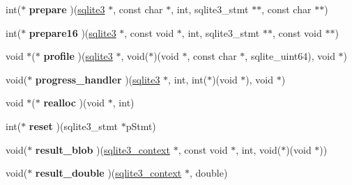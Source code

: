 \begin{DoxyCompactItemize}
\item 
\hypertarget{structsqlite3__api__routines_a6d5170ffef9564b7f9b157a14df4fd4d}{int($\ast$ {\bfseries prepare} )(\hyperlink{structsqlite3}{sqlite3} $\ast$, const char $\ast$, int, sqlite3\-\_\-stmt $\ast$$\ast$, const char $\ast$$\ast$)}\label{structsqlite3__api__routines_a6d5170ffef9564b7f9b157a14df4fd4d}

\item 
\hypertarget{structsqlite3__api__routines_a3877cfcfebeb05e357317ab50a47e52e}{int($\ast$ {\bfseries prepare16} )(\hyperlink{structsqlite3}{sqlite3} $\ast$, const void $\ast$, int, sqlite3\-\_\-stmt $\ast$$\ast$, const void $\ast$$\ast$)}\label{structsqlite3__api__routines_a3877cfcfebeb05e357317ab50a47e52e}

\item 
\hypertarget{structsqlite3__api__routines_aa3613866ee257c4b50e78bec33b7fb3a}{void $\ast$($\ast$ {\bfseries profile} )(\hyperlink{structsqlite3}{sqlite3} $\ast$, void($\ast$)(void $\ast$, const char $\ast$, sqlite\-\_\-uint64), void $\ast$)}\label{structsqlite3__api__routines_aa3613866ee257c4b50e78bec33b7fb3a}

\item 
\hypertarget{structsqlite3__api__routines_a2888055619addf1d754e25d159d85718}{void($\ast$ {\bfseries progress\-\_\-handler} )(\hyperlink{structsqlite3}{sqlite3} $\ast$, int, int($\ast$)(void $\ast$), void $\ast$)}\label{structsqlite3__api__routines_a2888055619addf1d754e25d159d85718}

\item 
\hypertarget{structsqlite3__api__routines_a8acf7aa698ed5e3a6ecc09ba9ced9fec}{void $\ast$($\ast$ {\bfseries realloc} )(void $\ast$, int)}\label{structsqlite3__api__routines_a8acf7aa698ed5e3a6ecc09ba9ced9fec}

\item 
\hypertarget{structsqlite3__api__routines_a0ac99b0282f1843dbd0170c22be99957}{int($\ast$ {\bfseries reset} )(sqlite3\-\_\-stmt $\ast$p\-Stmt)}\label{structsqlite3__api__routines_a0ac99b0282f1843dbd0170c22be99957}

\item 
\hypertarget{structsqlite3__api__routines_aab44964ab19917a95c1513890c5cdca2}{void($\ast$ {\bfseries result\-\_\-blob} )(\hyperlink{structsqlite3__context}{sqlite3\-\_\-context} $\ast$, const void $\ast$, int, void($\ast$)(void $\ast$))}\label{structsqlite3__api__routines_aab44964ab19917a95c1513890c5cdca2}

\item 
\hypertarget{structsqlite3__api__routines_a2a30d668aa648384ab1058cf77924c33}{void($\ast$ {\bfseries result\-\_\-double} )(\hyperlink{structsqlite3__context}{sqlite3\-\_\-context} $\ast$, double)}\label{structsqlite3__api__routines_a2a30d668aa648384ab1058cf77924c33}


\end{DoxyCompactItemize}
